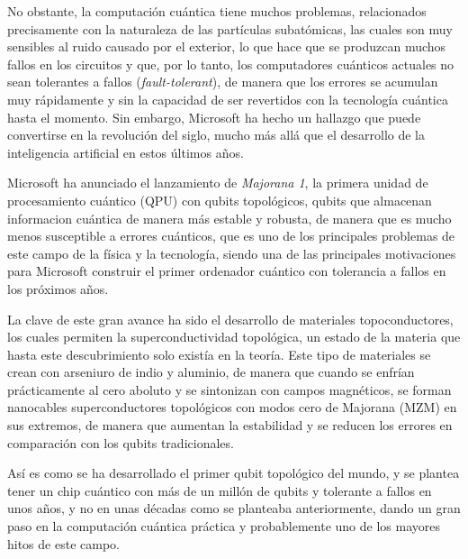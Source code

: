 \documentclass[12pt]{article}
\numberwithin{equation}{section} %
\begin{document}
    \vspace{5mm}

    No obstante, la computación cuántica tiene muchos problemas, relacionados precisamente con la naturaleza de las partículas subatómicas, las cuales son muy sensibles al ruido causado por el exterior, lo que hace que se produzcan muchos fallos en los circuitos y que, por lo tanto, los computadores cuánticos actuales no sean tolerantes a fallos (\textit{fault-tolerant}), de manera que los errores se acumulan muy rápidamente y sin la capacidad de ser revertidos con la tecnología cuántica hasta el momento. Sin embargo, Microsoft ha hecho un hallazgo que puede convertirse en la revolución del siglo, mucho más allá que el desarrollo de la inteligencia artificial en estos últimos años.

    \vspace{5mm}

    Microsoft ha anunciado el lanzamiento de \textit{Majorana 1}, la primera unidad de procesamiento cuántico (QPU) con qubits topológicos, qubits que almacenan informacion cuántica de manera más estable y robusta, de manera que es mucho menos susceptible a errores cuánticos, que es uno de los principales problemas de este campo de la física y la tecnología, siendo una de las principales motivaciones para Microsoft construir el primer ordenador cuántico con tolerancia a fallos en los próximos años.

    \vspace{5mm}

    La clave de este gran avance ha sido el desarrollo de materiales topoconductores, los cuales permiten la superconductividad topológica, un estado de la materia que hasta este descubrimiento solo existía en la teoría. Este tipo de materiales se crean con arseniuro de indio y aluminio, de manera que cuando se enfrían prácticamente al cero aboluto y se sintonizan con campos magnéticos, se forman nanocables superconductores topológicos con modos cero de Majorana (MZM) en sus extremos, de manera que aumentan la estabilidad y se reducen los errores en comparación con los qubits tradicionales.
    \vspace{5mm}

    Así es como se ha desarrollado el primer qubit topológico del mundo, y se plantea tener un chip cuántico con más de un millón de qubits y tolerante a fallos en unos años, y no en unas décadas como se planteaba anteriormente, dando un gran paso en la computación cuántica práctica y probablemente uno de los mayores hitos de este campo.
\end{document}
